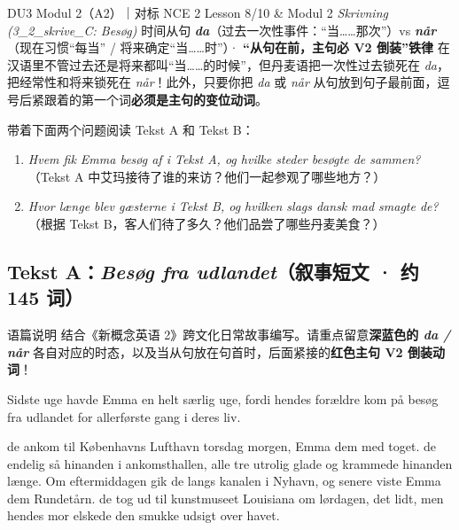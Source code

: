 {DU3 Modul 2（A2）｜对标 NCE 2 Lesson 8/10 \& Modul 2 \textit{Skrivning (3\_2\_skrive\_C: Besøg)}}
{时间从句 \textbf{\textit{da}}（过去一次性事件：“当……那次”）vs \textbf{\textit{når}}（现在习惯“每当” / 将来确定“当……时”）· \textbf{“从句在前，主句必 V2 倒装”铁律}}
{在汉语里不管过去还是将来都叫“当……的时候”，但丹麦语把一次性过去锁死在 \textit{da}，把经常性和将来锁死在 \textit{når}！此外，只要你把 \textit{da} 或 \textit{når} 从句放到句子最前面，逗号后紧跟着的第一个词\textbf{必须是主句的变位动词}。}

\begin{foerduleaeser}
带着下面两个问题阅读 Tekst A 和 Tekst B：
\begin{enumerate}
  \item \textit{Hvem fik Emma besøg af i Tekst A, og hvilke steder besøgte de sammen?}（Tekst A 中艾玛接待了谁的来访？他们一起参观了哪些地方？）
  \item \textit{Hvor længe blev gæsterne i Tekst B, og hvilken slags dansk mad smagte de?}（根据 Tekst B，客人们待了多久？他们品尝了哪些丹麦美食？）
\end{enumerate}
\end{foerduleaeser}


\subsection*{Tekst A：\textit{Besøg fra udlandet}（叙事短文 · 约 145 词）}

\begin{tipbox}{语篇说明}
结合《新概念英语 2》跨文化日常故事编写。请重点留意\textbf{\color{NCDNavy}深蓝色的 \textit{da / når}} 各自对应的时态，以及当从句放在句首时，后面紧接的\textbf{\color{NCDRed}红色主句 V2 倒装动词}！
\end{tipbox}

Sidste uge havde Emma en helt særlig uge, fordi hendes forældre kom på besøg fra udlandet for allerførste gang i deres liv.

 de ankom til Københavns Lufthavn torsdag morgen,  Emma dem med toget.  de endelig så hinanden i ankomsthallen,  alle tre utrolig glade og krammede hinanden længe. Om eftermiddagen gik de langs kanalen i Nyhavn, og senere viste Emma dem Rundetårn.  de tog ud til kunstmuseet Louisiana om lørdagen,  det lidt, men hendes mor elskede den smukke udsigt over havet.

